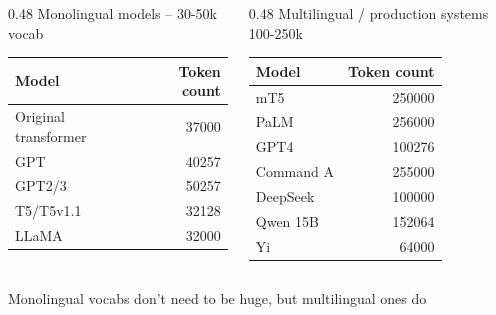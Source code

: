 \begin{columns}[T]
\begin{column}{0.48\textwidth}
\centering
Monolingual models -- 30-50k vocab

\medskip
\small
\begin{tabular}{@{}lr@{}}
\toprule
\textbf{Model} & \textbf{Token count}\\
\midrule
Original transformer & 37000\\
GPT & 40257\\
GPT2/3 & 50257\\
T5/T5v1.1 & 32128\\
LLaMA & 32000\\
\bottomrule
\end{tabular}
\end{column}
\begin{column}{0.48\textwidth}
\centering
Multilingual / production systems 100-250k

\medskip
\small
\begin{tabular}{@{}lr@{}}
\toprule
\textbf{Model} & \textbf{Token count}\\
\midrule
mT5 & 250000\\
PaLM & 256000\\
GPT4 & 100276\\
Command A & 255000\\
DeepSeek & 100000\\
Qwen 15B & 152064\\
Yi & 64000\\
\bottomrule
\end{tabular}
\end{column}
\end{columns}
\medskip
{\centering Monolingual vocabs don't need to be huge, but multilingual ones do\par}
